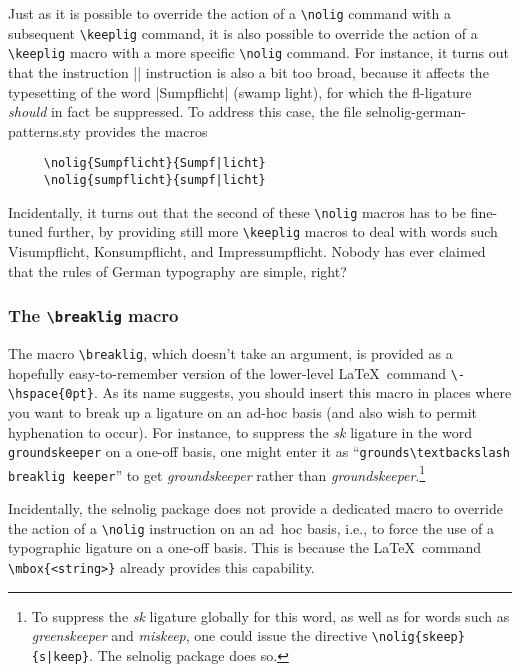 \documentclass[11pt]{article}
\newcommand{\pkg}[1]{\textsf{#1}}
\newcommand{\cmmd}[1]{\texttt{\textbackslash #1}}
\begin{document}
Just as it is possible to override the action of a \cmmd{nolig} command with a subsequent \cmmd{keeplig} command, it is also possible to override the action of a \cmmd{keeplig} macro with a more specific \cmmd{nolig} command. For instance, it turns out that the instruction || instruction is also a bit too broad, because it affects the typesetting of the word |Sumpflicht| (swamp light), for which the fl-ligature \emph{should} in fact be suppressed. To address this case, the file \pkg{selnolig-german-patterns.sty} provides the macros 
\begin{Verbatim}
     \nolig{Sumpflicht}{Sumpf|licht}
     \nolig{sumpflicht}{sumpf|licht}
\end{Verbatim}

Incidentally, it turns out that the second of these \cmmd{nolig} macros has to be fine-tuned further, by providing still more \cmmd{keeplig} macros to deal with words such Visumpflicht, Konsumpflicht, and Impressumpflicht. Nobody has ever claimed that the rules of German typography are simple, right?


\subsubsection{The \cmmd{breaklig} macro} 
\label{sec:breaklig}

The macro \cmmd{breaklig}, which doesn't take an argument, is provided as a hopefully easy-to-remember version of the lower-level \LaTeX\ command \Verb+\-\hspace{0pt}+. As its name suggests, you should insert this macro in places where you want to break up a ligature on an ad-hoc basis (and also wish to permit hyphenation to occur). For instance, to suppress the \emph{\mbox{sk}} ligature in the word \Verb+groundskeeper+ on a one-off basis, one might enter it as \enquote{\Verb+grounds\textbackslash breaklig keeper+} to get \emph{\ebg groundskeeper} rather than \emph{\ebg ground\mbox{sk}eeper}.\footnote{To suppress the {\ebg \emph{\mbox{sk}}} ligature globally for this word, as well as for words such as \emph{\ebg greenskeeper} and \emph{\ebg miskeep}, one could issue the directive \Verb+\nolig{skeep}{s|keep}+. The \pkg{selnolig} package does so.}


Incidentally, the \pkg{selnolig} package does not provide a dedicated macro to override the action of a \cmmd{nolig} instruction on an ad~hoc basis, i.e., to force the use of a typographic ligature on a one-off basis. This is because the \LaTeX\ command \Verb+\mbox{<string>}+ already provides this capability.
\end{document}
